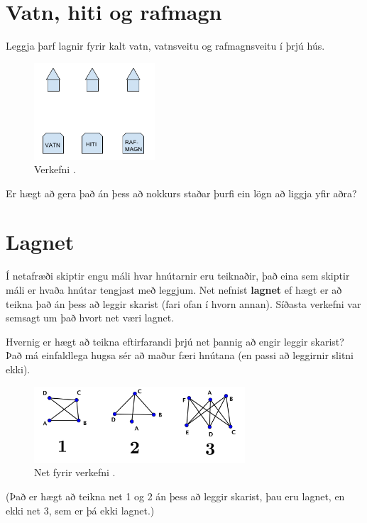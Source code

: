 \documentclass[b5paper,12pt]{book}
\renewcommand*\thesection{\arabic{section}}
\begin{document}
\section{Vatn, hiti og rafmagn}
\label{sec:vatnhiti}
Leggja þarf lagnir fyrir kalt vatn, vatnsveitu og rafmagnsveitu í þrjú hús.

\begin{figure}[h]
  \includegraphics[width=0.4\textwidth, center]{Myndir/Vatnhiti.png}
  \caption*{Verkefni \thesection{}.}
\end{figure}

\noindent 
Er hægt að gera það án þess að nokkurs staðar þurfi ein lögn að liggja yfir aðra?

\section{Lagnet}
Í netafræði skiptir engu máli hvar hnútarnir eru teiknaðir, það eina sem skiptir máli er hvaða hnútar tengjast með leggjum. Net nefnist \textbf{lagnet} ef hægt er að teikna það án þess að leggir skarist (fari ofan í hvorn annan). Síðasta verkefni var semsagt um það hvort net væri lagnet.

Hvernig er hægt að teikna eftirfarandi þrjú net þannig að engir leggir skarist? Það má einfaldlega hugsa sér að maður færi hnútana (en passi að leggirnir slitni ekki).
\begin{figure}[h]
  \includegraphics[width=0.7\textwidth, center]{Myndir/3Lagnet.png}
  \caption*{Net fyrir verkefni \thesection{}.}
\end{figure}

(Það er hægt að teikna net 1 og 2 án þess að leggir skarist, þau eru lagnet, en ekki net 3, sem er þá ekki lagnet.)
\end{document}

